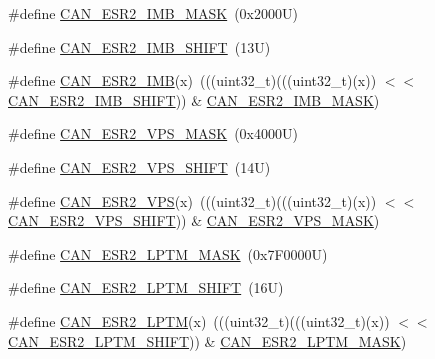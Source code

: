 \begin{DoxyCompactItemize}
\item 
\#define \mbox{\hyperlink{group___c_a_n___register___masks_ga8e8d269c3e59c20582dd8d0c5ea07daf}{C\+A\+N\+\_\+\+E\+S\+R2\+\_\+\+I\+M\+B\+\_\+\+M\+A\+SK}}~(0x2000\+U)
\item 
\#define \mbox{\hyperlink{group___c_a_n___register___masks_gac5b6c49733501a621096ab8226acafd0}{C\+A\+N\+\_\+\+E\+S\+R2\+\_\+\+I\+M\+B\+\_\+\+S\+H\+I\+FT}}~(13\+U)
\item 
\#define \mbox{\hyperlink{group___c_a_n___register___masks_gafc2fcffc8e22939a00461e21a9c4acb9}{C\+A\+N\+\_\+\+E\+S\+R2\+\_\+\+I\+MB}}(x)~(((uint32\+\_\+t)(((uint32\+\_\+t)(x)) $<$$<$ \mbox{\hyperlink{group___c_a_n___register___masks_gac5b6c49733501a621096ab8226acafd0}{C\+A\+N\+\_\+\+E\+S\+R2\+\_\+\+I\+M\+B\+\_\+\+S\+H\+I\+FT}})) \& \mbox{\hyperlink{group___c_a_n___register___masks_ga8e8d269c3e59c20582dd8d0c5ea07daf}{C\+A\+N\+\_\+\+E\+S\+R2\+\_\+\+I\+M\+B\+\_\+\+M\+A\+SK}})
\item 
\#define \mbox{\hyperlink{group___c_a_n___register___masks_ga5fc376e62f61a97583edf7a54b8753be}{C\+A\+N\+\_\+\+E\+S\+R2\+\_\+\+V\+P\+S\+\_\+\+M\+A\+SK}}~(0x4000\+U)
\item 
\#define \mbox{\hyperlink{group___c_a_n___register___masks_ga7c22b4e9fdd8beae74e86b256db23665}{C\+A\+N\+\_\+\+E\+S\+R2\+\_\+\+V\+P\+S\+\_\+\+S\+H\+I\+FT}}~(14\+U)
\item 
\#define \mbox{\hyperlink{group___c_a_n___register___masks_ga3dd8f8d7ecc080d8f0daa5e6a132df1d}{C\+A\+N\+\_\+\+E\+S\+R2\+\_\+\+V\+PS}}(x)~(((uint32\+\_\+t)(((uint32\+\_\+t)(x)) $<$$<$ \mbox{\hyperlink{group___c_a_n___register___masks_ga7c22b4e9fdd8beae74e86b256db23665}{C\+A\+N\+\_\+\+E\+S\+R2\+\_\+\+V\+P\+S\+\_\+\+S\+H\+I\+FT}})) \& \mbox{\hyperlink{group___c_a_n___register___masks_ga5fc376e62f61a97583edf7a54b8753be}{C\+A\+N\+\_\+\+E\+S\+R2\+\_\+\+V\+P\+S\+\_\+\+M\+A\+SK}})
\item 
\#define \mbox{\hyperlink{group___c_a_n___register___masks_ga864e9e1cd2a2b0e354b284bd5488f29e}{C\+A\+N\+\_\+\+E\+S\+R2\+\_\+\+L\+P\+T\+M\+\_\+\+M\+A\+SK}}~(0x7\+F0000\+U)
\item 
\#define \mbox{\hyperlink{group___c_a_n___register___masks_gace1651295c821917bb5b37915baa3771}{C\+A\+N\+\_\+\+E\+S\+R2\+\_\+\+L\+P\+T\+M\+\_\+\+S\+H\+I\+FT}}~(16\+U)
\item 
\#define \mbox{\hyperlink{group___c_a_n___register___masks_ga4462429a39fcbba8b4db218d8a928e88}{C\+A\+N\+\_\+\+E\+S\+R2\+\_\+\+L\+P\+TM}}(x)~(((uint32\+\_\+t)(((uint32\+\_\+t)(x)) $<$$<$ \mbox{\hyperlink{group___c_a_n___register___masks_gace1651295c821917bb5b37915baa3771}{C\+A\+N\+\_\+\+E\+S\+R2\+\_\+\+L\+P\+T\+M\+\_\+\+S\+H\+I\+FT}})) \& \mbox{\hyperlink{group___c_a_n___register___masks_ga864e9e1cd2a2b0e354b284bd5488f29e}{C\+A\+N\+\_\+\+E\+S\+R2\+\_\+\+L\+P\+T\+M\+\_\+\+M\+A\+SK}})
\end{DoxyCompactItemize}
